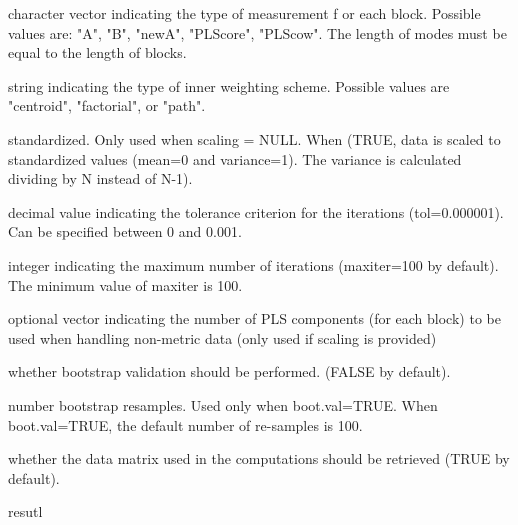 \documentclass[a4paper]{book}
\begin{document}
\begin{Arguments}
\begin{ldescription}
\item[\code{scaling}] character vector indicating the type of measurement f
or each block. Possible values are: "A", "B", "newA", "PLScore",
"PLScow". The length of modes must be equal to the length of blocks.

\item[\code{scheme}] string indicating the type of inner weighting scheme.
Possible values are "centroid", "factorial", or "path".

\item[\code{scaled}] standardized. Only used when scaling = NULL.
When (TRUE, data is scaled to standardized values (mean=0 and variance=1).
The variance is calculated dividing by N instead of N-1).

\item[\code{tol}] decimal value indicating the tolerance criterion
for the iterations (tol=0.000001). Can be specified between 0 and 0.001.

\item[\code{maxiter}] integer indicating the maximum number of iterations
(maxiter=100 by default). The minimum value of maxiter is 100.

\item[\code{plscomp}] optional vector indicating the number of PLS components
(for each block) to be used when handling non-metric data
(only used if scaling is provided)

\item[\code{boot.val}] whether bootstrap validation should be performed.
(FALSE by default).

\item[\code{br}] number bootstrap resamples. Used only when boot.val=TRUE. When boot.val=TRUE, the default number of re-samples is 100.

\item[\code{dataset}] whether the data matrix used in the computations should be retrieved (TRUE by default).
\end{ldescription}
\end{Arguments}
%
\begin{Value}
resutl
\end{Value}
%
\end{document}
